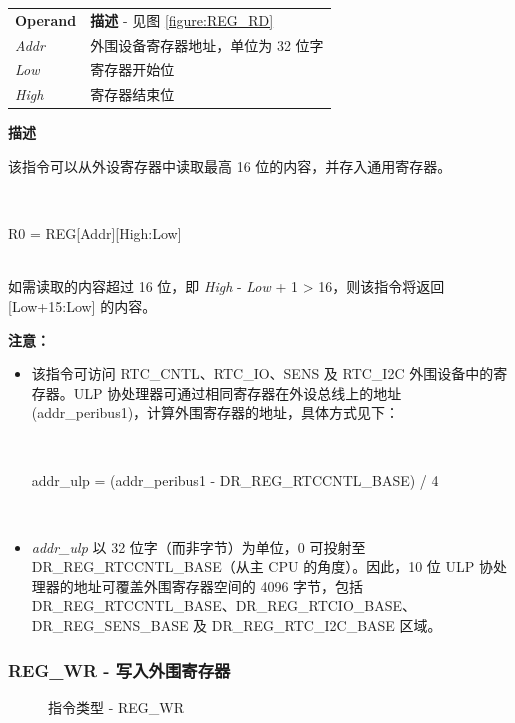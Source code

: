 \documentclass[main\_\_CN.tex]{subfiles}
\begin{document}
\begin{tabular}{ l l }
\textbf{Operand} & \textbf{描述} - 见图 \ref{figure:REG_RD} \\
\textit{Addr} & 外围设备寄存器地址，单位为 32 位字 \\
\textit{Low} & 寄存器开始位 \\
\textit{High} & 寄存器结束位
\end{tabular}

\textbf{描述}

该指令可以从外设寄存器中读取最高 16 位的内容，并存入通用寄存器。

~
\begin{centering}
    R0 = REG[Addr][High:Low] \\
\end{centering}
~\\
如需读取的内容超过 16 位，即 \textit{High} - \textit{Low} + 1 > 16，则该指令将返回 [Low+15:Low] 的内容。

\textbf{注意：}
\begin{itemize}
    \item 该指令可访问 RTC\_CNTL、RTC\_IO、SENS 及 RTC\_I2C 外围设备中的寄存器。ULP 协处理器可通过相同寄存器在外设总线上的地址 (addr\_peribus1)，计算外围寄存器的地址，具体方式见下：

    ~
    \begin{centering}
        addr\_ulp = (addr\_peribus1 - DR\_REG\_RTCCNTL\_BASE) / 4 \\
    \end{centering}
    ~

    \item \textit{addr\_ulp} 以 32 位字（而非字节）为单位，0 可投射至 DR\_REG\_RTCCNTL\_BASE（从主 CPU 的角度）。因此，10 位 ULP 协处理器的地址可覆盖外围寄存器空间的 4096 字节，包括 DR\_REG\_RTCCNTL\_BASE、DR\_REG\_RTCIO\_BASE、DR\_REG\_SENS\_BASE 及 DR\_REG\_RTC\_I2C\_BASE 区域。
\end{itemize}



\subsubsection {REG\_WR - 写入外围寄存器} \label{subsection:REG_WR}

%
%
%
%
%
\begin{figure}[!ht]
    \centering
    \caption{指令类型 - REG\_WR}
    \label{figure:REG_WR}
\end{figure}
\end{document}
